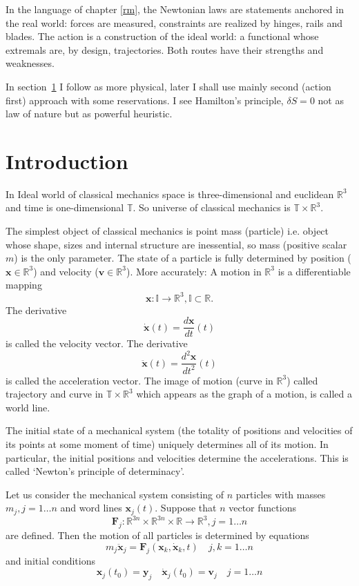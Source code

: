 In the language of chapter \ref{rm}, the Newtonian laws are statements anchored
in the real world: forces are measured, constraints are realized by hinges,
rails and blades. The action is a construction of the ideal world: a functional
whose extremals are, by design, trajectories. Both routes have their strengths
and weaknesses.

In section~\ref{sec:cis-intro} I follow \cite{Arnold1989} as more physical, later
I shall use mainly second (action first) approach with some reservations.
I see Hamilton's principle, $\delta S=0$ not as law of nature but as 
powerful heuristic.

\section{Introduction}
\label{sec:cis-intro}
In Ideal world of classical mechanics space is three-dimensional  and euclidean
$\mathbb{R}^3$ and time is one-dimensional $\mathbb{T}$.
So universe of classical mechanics is $\mathbb{T} \times \mathbb{R}^3$. 

The simplest object of classical mechanics is point mass (particle) i.e. object
whose shape, sizes and internal structure are inessential, so mass (positive
scalar $m$) is the only parameter. 
The state of a particle is fully determined by position ($\bm x \in\mathbb{R}^3$) 
and velocity ($\bm v \in\mathbb{R}^3$). 
More accurately: A motion in $\mathbb{R}^3$ is a differentiable mapping 
\[\bm x: \mathbb{I}\rightarrow \mathbb{R}^3, \mathbb{I} \subset \mathbb{R}.\] 
The derivative 
\[\dot {\bm x}(t)=\frac{d{\bm x}}{dt}(t)\]
is called the velocity vector. 
The derivative 
\[\ddot {\bm x}(t)=\frac{ d^2 {\bm x}}{dt^2}(t)\]
is called the acceleration vector. 
The image of motion (curve in $\mathbb{R}^3$) called trajectory and  curve in 
$\mathbb{T} \times \mathbb{R}^3$ which appears  as the graph of a motion, is
called a world line.

The initial state of a mechanical system (the totality of positions and
velocities of its points at some moment of time) uniquely determines all of
its motion. In particular, the initial positions and velocities determine the
accelerations. This is called `Newton's principle of determinacy'.

Let us consider the mechanical system consisting of $n$ particles 
with masses $m_j,j=1\ldots n$ and word lines $\bm x_j(t)$.
Suppose that $n$ vector functions   
\[{\bm F}_j:\mathbb{R}^{3 n}\times\mathbb{R}^{3 n}
\times\mathbb{R}\rightarrow\mathbb{R}^3,j=1\ldots n\]
are defined. Then the motion of all particles is determined by equations
\begin{equation}
  \label {newton-eq}
    m_j \ddot {\bm x}_j={\bm F}_j({\bm x}_k,\dot {\bm x}_k,t) \quad j,k=1\ldots n 
\end{equation}
and initial conditions
\begin{equation}
\label {newton-ic}
    {\bm x}_j(t_0)={\bm y}_j\quad\dot {\bm x}_j(t_0)={\bm v}_j  \quad j=1\ldots n 
\end{equation}

